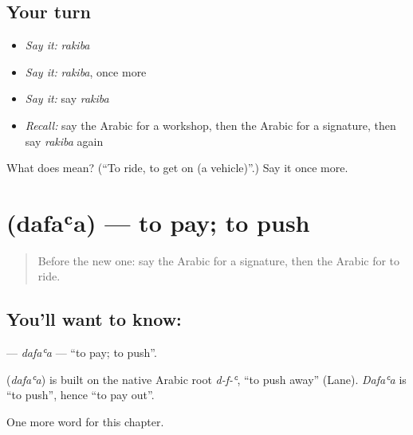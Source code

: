\subsection*{Your turn}
\begin{itemize}
\raggedright
  \item \emph{Say it:} \emph{rakiba}
  \item \emph{Say it:} \emph{rakiba}, once more
  \item \emph{Say it:} say \emph{rakiba}
  \item \emph{Recall:} say the Arabic for a workshop, then the Arabic for a signature, then say \emph{rakiba} again
\end{itemize}

\begin{tcolorbox}[breakable,colback=teal!4,colframe=teal!35!black,title={Before you move on}]
What does  mean? (\textquotedblleft{}To ride, to get on (a vehicle)\textquotedblright{}.) Say it once more.
\end{tcolorbox}
\section[\texorpdfstring{\ar{دفع} (dafaʿa)}{دفع (dafaʿa)}]{ (dafaʿa) — to pay; to push}

\label{lesson:AR-C192-dafaa}



\begin{quote}
Before the new one: say the Arabic for a signature, then the Arabic for to ride.
\end{quote}

\subsection*{You'll want to know: }
\textbf{} — \emph{dafaʿa} — \textquotedblleft{}to pay; to push\textquotedblright{}.

\begin{cousinweb}
\textbf{} (\emph{dafaʿa}) is built on the native Arabic root \emph{d-f-ʿ}, \textquotedblleft{}to push away\textquotedblright{} (Lane). \emph{Dafaʿa} is \textquotedblleft{}to push\textquotedblright{}, hence \textquotedblleft{}to pay out\textquotedblright{}.
\end{cousinweb}

\begin{grammarlens}[title={What you've built}]
One more word for this chapter.
\end{grammarlens}

